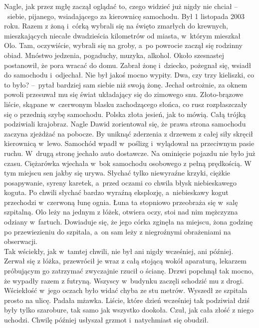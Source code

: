 \documentclass[../MAIN.tex]{subfiles}
\begin{document}
\hspace{1ex}Nagle, jak przez mgłę zaczął oglądać to, czego widzieć już nigdy nie chciał --~siebie, pijanego, wsiadającego za kierownicę samochodu.
Był 1 listopada 2003 roku. Razem z żoną i~córką wybrali się na święto zmarłych do krewnych, mieszkających niecałe dwadzieścia kilometrów od miasta, w~którym mieszkał Olo. Tam, oczywiście, wybrali się na groby, a~po powrocie zaczął się rodzinny obiad. Mnóstwo jedzenia, pogaduchy, muzyka, alkohol. Około szesnastej postanowił, że pora wracać do domu. Zabrał żonę i~dziecko, pożegnał się, wsiadł do samochodu i~odjechał. Nie był jakoś mocno wypity.
\dd
\sd
\xx Dwa, czy trzy kieliszki, co to było? --~pytał bardziej sam siebie niż swoją żonę.
\qd
\dd
Jechał ostrożnie, za oknem powoli przesuwał mu się świat układający się do zimowego snu. Złoto-brązowe liście, skąpane w~czerwonym blasku zachodzącego słońca, co rusz rozpłaszczały się o przednią szybę samochodu. Polska złota jesień, jak to mówią. Całą trójką podziwiali krajobraz. Nagle Dawid zorientował się, że prawa strona samochodu zaczyna zjeżdżać na pobocze. By uniknąć zderzenia z drzewem z całej siły skręcił kierownicą w~lewo. Samochód wpadł w~poślizg i~wylądował na przeciwnym pasie ruchu. W~drugą stronę jechało auto dostawcze. Na ominięcie pojazdu nie było już czasu. Ciężarówka wjechała w~bok samochodu osobowego z pełną prędkością.
\pp
W tym miejscu sen jakby się urywa. Słychać tylko niewyraźne krzyki, ciężkie posapywanie, syreny karetek, a~przed oczami co chwila błysk niebieskawego koguta. Po chwili słychać bardzo wyraźną eksplozję, a~niebieskawy kogut przechodzi w~czerwoną łunę ognia. Łuna ta stopniowo przeobraża się w~salę szpitalną. Olo leży na jednym z łóżek, otwiera oczy, stoi nad nim mężczyzna odziany w~fartuch. Dowiaduje się, że jego córka zginęła na miejscu, żona godzinę po przewiezieniu do szpitala, a~on sam leży z niegroźnymi obrażeniami na obserwacji.\\
Tak wściekły, jak w~tamtej chwili, nie był ani nigdy wcześniej, ani później. Zerwał się z łóżka, przewrócił je wraz z całą stojącą wokół aparaturą, lekarzem próbującym go zatrzymać zwyczajnie rzucił o ścianę. Drzwi popchnął tak mocno, że wypadły razem z futryną. Wszyscy w~budynku zaczęli schodzić mu z drogi. Wściekłość w~jego oczach było widać chyba ze stu metrów. Wyszedł ze szpitala prosto na ulicę. Padała mżawka. Liście, które dzień wcześniej tak podziwiał dziś były tylko
szarobure, tak samo jak wszystko dookoła. Czuł, jak cała złość z niego uchodzi.
Chwilę później usłyszał grzmot i~natychmiast się obudził.
\end{document}
